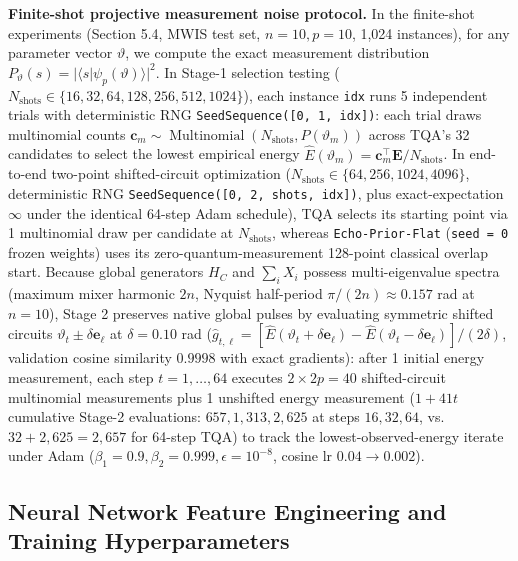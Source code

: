 \documentclass{article}
\theoremstyle{plain}
\theoremstyle{definition}
\begin{document}
\textbf{Finite-shot projective measurement noise protocol.} In the finite-shot experiments (Section 5.4, MWIS test set, $n=10, p=10$, 1,024 instances), for any parameter vector $\vartheta$, we compute the exact measurement distribution $P_\vartheta(s)=|\langle s|\psi_p(\vartheta)\rangle|^2$. In Stage-1 selection testing ($N_{\mathrm{shots}}\in\{16,32,64,128,256,512,1024\}$), each instance \texttt{idx} runs 5 independent trials with deterministic RNG \texttt{SeedSequence([0, 1, idx])}: each trial draws multinomial counts $\boldsymbol{c}_m\sim\operatorname{Multinomial}(N_{\mathrm{shots}},P(\vartheta_m))$ across TQA's 32 candidates to select the lowest empirical energy $\widehat E(\vartheta_m)=\boldsymbol{c}_m^\top\boldsymbol{E}/N_{\mathrm{shots}}$. In end-to-end two-point shifted-circuit optimization ($N_{\mathrm{shots}}\in\{64,256,1024,4096\}$, deterministic RNG \texttt{SeedSequence([0, 2, shots, idx])}, plus exact-expectation $\infty$ under the identical 64-step Adam schedule), TQA selects its starting point via 1 multinomial draw per candidate at $N_{\mathrm{shots}}$, whereas \texttt{Echo-Prior-Flat} (\texttt{seed = 0} frozen weights) uses its zero-quantum-measurement 128-point classical overlap start. Because global generators $H_C$ and $\sum_i X_i$ possess multi-eigenvalue spectra (maximum mixer harmonic $2n$, Nyquist half-period $\pi/(2n)\approx 0.157$ rad at $n=10$), Stage 2 preserves native global pulses by evaluating symmetric shifted circuits $\vartheta_t \pm \delta\boldsymbol{e}_\ell$ at $\delta=0.10$ rad ($\widehat g_{t,\ell}=[\widehat E(\vartheta_t+\delta\boldsymbol{e}_\ell)-\widehat E(\vartheta_t-\delta\boldsymbol{e}_\ell)]/(2\delta)$, validation cosine similarity $0.9998$ with exact gradients): after 1 initial energy measurement, each step $t=1,\ldots,64$ executes $2\times 2p=40$ shifted-circuit multinomial measurements plus 1 unshifted energy measurement ($1+41t$ cumulative Stage-2 evaluations: $657, 1{,}313, 2{,}625$ at steps $16, 32, 64$, vs. $32+2{,}625=2{,}657$ for 64-step TQA) to track the lowest-observed-energy iterate under Adam ($\beta_1=0.9, \beta_2=0.999, \epsilon=10^{-8}$, cosine lr $0.04\to 0.002$).

\subsection{Neural Network Feature Engineering and Training Hyperparameters}\label{subsec:b_3}
\end{document}
